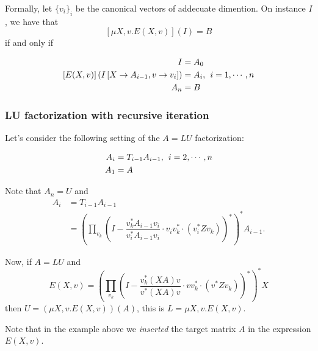 Formally, let $\lbrace v_i\rbrace_i$ be the canonical vectors of addecuate dimention. On instance $I$, we have that $$\left[\mu X, v. E(X,v)\right](I)=B$$ if and only if

\begin{align*}
I &= A_0 \\
\left[E(X, v)\right](I\left[X\rightarrow A_{i-1}, v\rightarrow v_{i}\right])&=A_i,\hspace{1ex}i=1,\cdots, n \\
A_n &= B
\end{align*}

\subsubsection*{LU factorization with recursive iteration}
Let's consider the following setting of the $A=LU$ factorization:

\begin{align*}
A_i&=T_{i-1}A_{i-1},\hspace{1ex}i=2, \cdots, n \\
A_1&=A \\
\end{align*}

Note that $A_n=U$ and 
\begin{align*}
A_i&=T_{i-1}A_{i-1} \\
&=\left(\prod_{v_k}\left(I-\dfrac{v_k^*A_{i-1}v_i}{v_i^*A_{i-1}v_i}\cdot v_iv_k^*\cdot\left(v_i^*Zv_k\right)\right)^*\right)^*A_{i-1}.
\end{align*}

Now, if $A=LU$ and $$E(X, v)=\left(\prod_{v_k}\left(I-\dfrac{v_k^*(XA)v}{v^*(XA)v}\cdot vv_k^*\cdot\left(v^*Zv_k\right)\right)^*\right)^*X$$
then $U=(\mu X, v.E(X,v))(A)$, this is $L=\mu X, v.E(X,v)$.

Note that in the example above we \textit{inserted} the target matrix $A$ in the expression $E(X,v)$.

